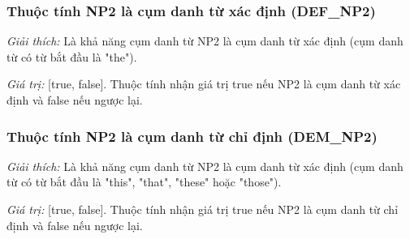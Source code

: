 \documentclass[12pt]{extarticle}
\begin{document}
			\subsubsection*{Thuộc tính NP2 là cụm danh từ xác định (DEF\_NP2)}
				\par \textit{Giải thích:} Là khả năng cụm danh từ NP2 là cụm danh từ xác định (cụm danh từ có từ bắt đầu là "the"). 
				\par \textit{Giá trị:} [true, false]. Thuộc tính nhận giá trị true nếu NP2 là cụm danh từ xác định và false nếu ngược lại.

			\subsubsection*{Thuộc tính NP2 là cụm danh từ chỉ định (DEM\_NP2)}
				\par \textit{Giải thích:} Là khả năng cụm danh từ NP2 là cụm danh từ xác định (cụm danh từ có từ bắt đầu là "this", "that", "these" hoặc "those"). 
				\par \textit{Giá trị:} [true, false]. Thuộc tính nhận giá trị true nếu NP2 là cụm danh từ chỉ định và false nếu ngược lại.
\end{document}
